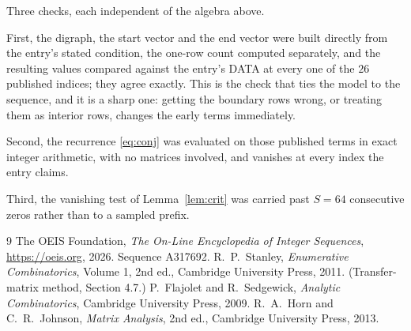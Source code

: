 \documentclass[11pt,a4paper]{article}
\theoremstyle{plain}
\theoremstyle{definition}
\begin{document}
Three checks, each independent of the algebra above.

First, the digraph, the start vector and the end vector were built directly from the
entry's stated condition, the one-row count computed separately, and the resulting values
compared against the entry's DATA at every one of the $26$ published indices; they
agree exactly. This is the check that ties the model to the sequence, and it is a sharp one:
getting the boundary rows wrong, or treating them as interior rows, changes the early terms
immediately.

Second, the recurrence \eqref{eq:conj} was evaluated on those published terms in exact
integer arithmetic, with no matrices involved, and vanishes at every index the entry claims.

Third, the vanishing test of Lemma~\ref{lem:crit} was carried past $S=64$ consecutive
zeros rather than to a sampled prefix.

\begin{thebibliography}{9}
 The OEIS Foundation, \emph{The On-Line Encyclopedia of Integer
Sequences}, \url{https://oeis.org}, 2026. Sequence A317692.
 R.~P.~Stanley, \emph{Enumerative Combinatorics}, Volume 1, 2nd ed.,
Cambridge University Press, 2011. (Transfer-matrix method, Section 4.7.)
 P.~Flajolet and R.~Sedgewick, \emph{Analytic Combinatorics}, Cambridge
University Press, 2009.
 R.~A.~Horn and C.~R.~Johnson, \emph{Matrix Analysis}, 2nd ed., Cambridge
University Press, 2013.
\end{thebibliography}
\end{document}
